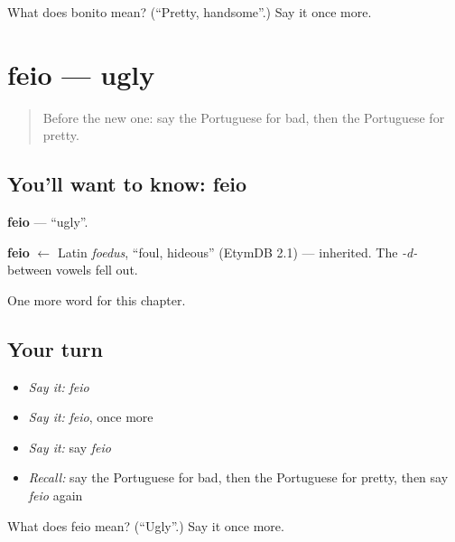 \begin{tcolorbox}[breakable,colback=teal!4,colframe=teal!35!black,title={Before you move on}]
What does bonito mean? (\textquotedblleft{}Pretty, handsome\textquotedblright{}.) Say it once more.
\end{tcolorbox}
\section[feio]{feio — ugly}

\label{lesson:PT-C65-feio}



\begin{quote}
Before the new one: say the Portuguese for bad, then the Portuguese for pretty.
\end{quote}

\subsection*{You'll want to know: feio}
\textbf{feio} — \textquotedblleft{}ugly\textquotedblright{}.

\begin{cousinweb}
\textbf{feio} $\leftarrow$ Latin \emph{foedus}, \textquotedblleft{}foul, hideous\textquotedblright{} (EtymDB 2.1) — inherited. The \emph{-d-} between vowels fell out.
\end{cousinweb}

\begin{grammarlens}[title={What you've built}]
One more word for this chapter.
\end{grammarlens}

\subsection*{Your turn}
\begin{itemize}
\raggedright
  \item \emph{Say it:} \emph{feio}
  \item \emph{Say it:} \emph{feio}, once more
  \item \emph{Say it:} say \emph{feio}
  \item \emph{Recall:} say the Portuguese for bad, then the Portuguese for pretty, then say \emph{feio} again
\end{itemize}

\begin{tcolorbox}[breakable,colback=teal!4,colframe=teal!35!black,title={Before you move on}]
What does feio mean? (\textquotedblleft{}Ugly\textquotedblright{}.) Say it once more.
\end{tcolorbox}
